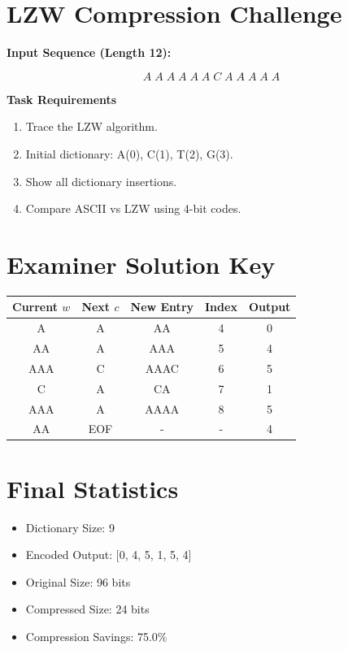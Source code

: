 \documentclass{article}
\begin{document}
\section*{LZW Compression Challenge}

\textbf{Input Sequence (Length 12):}

\[
A \; A \; A \; A \; A \; A \; C \; A \; A \; A \; A \; A
\]

\textbf{Task Requirements}
\begin{enumerate}
\item Trace the LZW algorithm.
\item Initial dictionary: A(0), C(1), T(2), G(3).
\item Show all dictionary insertions.
\item Compare ASCII vs LZW using 4-bit codes.
\end{enumerate}

\section*{Examiner Solution Key}

\begin{center}
\begin{tabular}{|c|c|c|c|c|}
\hline
Current $w$ & Next $c$ & New Entry & Index & Output \\
\hline
A & A & AA & 4 & 0 \\
\hline
AA & A & AAA & 5 & 4 \\
\hline
AAA & C & AAAC & 6 & 5 \\
\hline
C & A & CA & 7 & 1 \\
\hline
AAA & A & AAAA & 8 & 5 \\
\hline
AA & EOF & - & - & 4 \\
\hline

\end{tabular}
\end{center}

\section*{Final Statistics}
\begin{itemize}
\item Dictionary Size: 9
\item Encoded Output: [0, 4, 5, 1, 5, 4]
\item Original Size: 96 bits
\item Compressed Size: 24 bits
\item Compression Savings: 75.0\%
\end{itemize}
\end{document}
